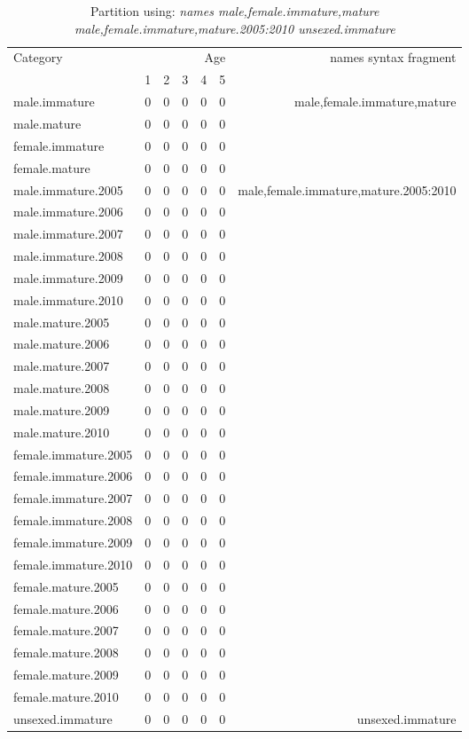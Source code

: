 \begin{table}[h]
\tiny
\center
\begin{tabular}{lrrrrrr}
Category&\multicolumn{5}{r}{Age} &names syntax fragment\\
\cline{2-6}
&1&2&3&4&5\\
\hline
male.immature&0&0&0&0&0&male,female.immature,mature\\
male.mature&0&0&0&0&0\\
female.immature&0&0&0&0&0\\
female.mature&0&0&0&0&0\\
male.immature.2005&0&0&0&0&0&male,female.immature,mature.2005:2010\\
male.immature.2006&0&0&0&0&0\\
male.immature.2007&0&0&0&0&0\\
male.immature.2008&0&0&0&0&0\\
male.immature.2009&0&0&0&0&0\\
male.immature.2010&0&0&0&0&0\\
male.mature.2005&0&0&0&0&0\\
male.mature.2006&0&0&0&0&0\\
male.mature.2007&0&0&0&0&0\\
male.mature.2008&0&0&0&0&0\\
male.mature.2009&0&0&0&0&0\\
male.mature.2010&0&0&0&0&0\\
female.immature.2005&0&0&0&0&0\\
female.immature.2006&0&0&0&0&0\\
female.immature.2007&0&0&0&0&0\\
female.immature.2008&0&0&0&0&0\\
female.immature.2009&0&0&0&0&0\\
female.immature.2010&0&0&0&0&0\\
female.mature.2005&0&0&0&0&0\\
female.mature.2006&0&0&0&0&0\\
female.mature.2007&0&0&0&0&0\\
female.mature.2008&0&0&0&0&0\\
female.mature.2009&0&0&0&0&0\\
female.mature.2010&0&0&0&0&0\\
unsexed.immature&0&0&0&0&0&unsexed.immature\\
  \end{tabular}
  \caption{Partition using: \textit{names male,female.immature,mature  male,female.immature,mature.2005:2010  unsexed.immature} }\label{Tab:part}
\end{table}

